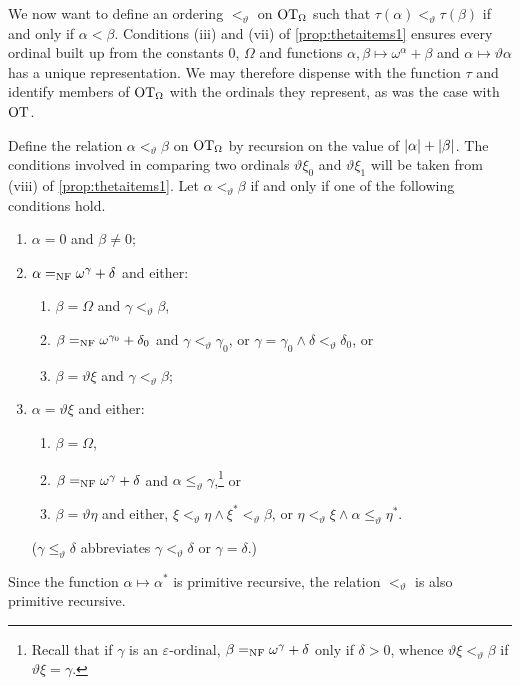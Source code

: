 \documentclass[UKenglish,cleveref,DIV=12]{scrartcl}
\newtheorem{lemma}{Lemma}[section]
\theoremstyle{definition}
\theoremstyle{definition}
\begin{document}
We now want to define an ordering $<_\vartheta$ on $\mathrm{OT}_\Omega$ such that
$\tau(\alpha)<_\vartheta\tau(\beta)$ if and only if $\alpha<\beta$. Conditions
(iii) and (vii) of \cref{prop:thetaitems1} ensures every ordinal built up
from the constants $0$, $\Omega$ and functions
$\alpha,\beta\mapsto\omega^\alpha+\beta$ and $\alpha\mapsto\vartheta\alpha$ has
a unique representation. We may therefore dispense with the
function $\tau$ and identify members of $\mathrm{OT}_\Omega$ with the ordinals they
represent, as was the case with $\mathrm{OT}$.

Define the relation $\alpha<_\vartheta\beta$ on $\mathrm{OT}_\Omega$ by
recursion on the value of $\lvert{\alpha}\rvert+\lvert{\beta}\rvert$. The conditions involved in
comparing two ordinals $\vartheta\xi_0$ and $\vartheta\xi_1$ will be taken from
(viii) of \cref{prop:thetaitems1}. Let $\alpha<_\vartheta\beta$ if and only
if one of the following conditions hold.
\begin{enumerate}
 \item $\alpha=0$ and $\beta\neq0$;
 \item $\alpha =_{\mathrm{NF}}\omega^\gamma+\delta$ and either:
 \begin{enumerate}
  \item $\beta=\Omega$ and $\gamma<_\vartheta\beta$,
  \item $\beta=_{\mathrm{NF}}\omega^{\gamma_0}+\delta_0$ and $\gamma<_\vartheta\gamma_0$, or $\gamma=\gamma_0\land\delta<_\vartheta\delta_0$, or
  \item $\beta=\vartheta\xi$ and $\gamma<_\vartheta\beta$;
 \end{enumerate}
 \item $\alpha=\vartheta\xi$ and either:
 \begin{enumerate}
  \item $\beta=\Omega$,
  \item $\beta=_{\mathrm{NF}}\omega^{\gamma}+\delta$ and $\alpha\le_\vartheta\gamma$,\footnote{Recall that if $\gamma$ is an $\varepsilon$-ordinal, $\beta=_{\mathrm{NF}}\omega^\gamma+\delta$ only if $\delta>0$, whence $\vartheta\xi<_\vartheta\beta$ if $\vartheta\xi=\gamma$.} or
  \item $\beta=\vartheta\eta$ and either, $\xi<_\vartheta\eta\land \xi^*<_\vartheta\beta$, or $\eta<_\vartheta\xi\land\alpha\le_\vartheta\eta^*$.
 \end{enumerate}
($\gamma\le_\vartheta\delta$ abbreviates $\gamma<_\vartheta\delta$ or $\gamma=\delta$.)
\end{enumerate}
Since the function $\alpha\mapsto\alpha^*$ is primitive recursive, the relation $<_\vartheta$ is also primitive recursive.
\end{document}
